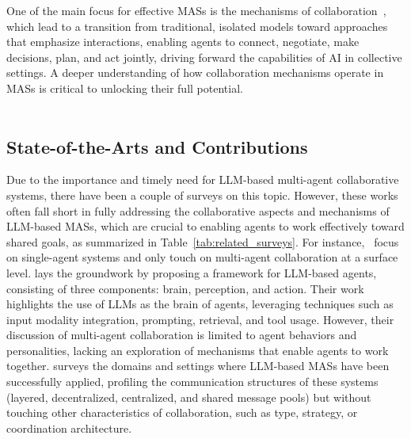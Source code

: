 \documentclass[acmsmall,nonacm]{acmart}
\begin{document}
        One of the main focus for effective MASs is the mechanisms of collaboration~\cite{li-etal-2023-theory,li2023camel,das2023enabling,pan2024agentcoordvisuallyexploringcoordination,wang-etal-2024-unleashing}, which lead to a transition from traditional, isolated models toward approaches that emphasize interactions, enabling agents to connect, negotiate, make decisions, plan, and act jointly, driving forward the capabilities of AI in collective settings. A deeper understanding of how collaboration mechanisms operate in MASs is critical to unlocking their full potential.
    \\
    \\

    \subsection{State-of-the-Arts and Contributions}

        Due to the importance and timely need for LLM-based multi-agent collaborative systems, there have been a couple of surveys on this topic. However, these works often fall short in fully addressing the collaborative aspects and mechanisms of LLM-based MASs, which are crucial to enabling agents to work effectively toward shared goals, as summarized in Table~\ref{tab:related_surveys}. For instance,~\cite{xi2023risepotentiallargelanguage,ijcai2024p890,10.1145/3704435} focus on single-agent systems and only touch on multi-agent collaboration at a surface level. \cite{xi2023risepotentiallargelanguage} lays the groundwork by proposing a framework for LLM-based agents, consisting of three components: brain, perception, and action. Their work highlights the use of LLMs as the brain of agents, leveraging techniques such as input modality integration, prompting, retrieval, and tool usage. However, their discussion of multi-agent collaboration is limited to agent behaviors and personalities, lacking an exploration of mechanisms that enable agents to work together. \cite{ijcai2024p890} surveys the domains and settings where LLM-based MASs have been successfully applied, profiling the communication structures of these systems (layered, decentralized, centralized, and shared message pools) but without touching other characteristics of collaboration, such as type, strategy, or coordination architecture. 
        
\end{document}
